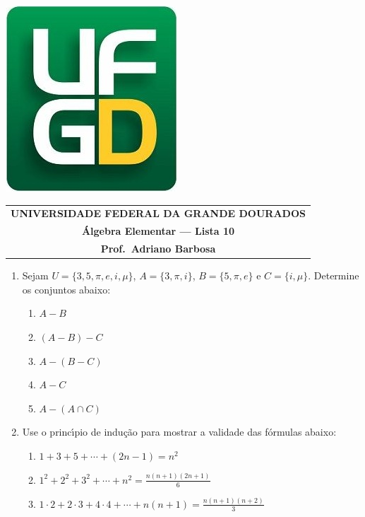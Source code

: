 \documentclass[a4paper,5pt]{amsbook}
\begin{document}
\thispagestyle{empty}
\pagestyle{empty}
\begin{minipage}[h]{0.14\textwidth}
	\includegraphics[scale=0.24]{../ufgd.png}
\end{minipage}
\begin{minipage}[h]{\textwidth}
\begin{tabular}{c}
{{\bf UNIVERSIDADE FEDERAL DA GRANDE DOURADOS}}\\
{{\bf \'Algebra Elementar --- Lista 10}}\\
{{\bf Prof.\ Adriano Barbosa}}\\
\end{tabular}
\vspace{-0.45cm}
%
\end{minipage}


\vspace{1cm}
\begin{enumerate}
    \vspace{0.5cm}
    \item Sejam $U=\{3,5,\pi,e,i,\mu\}$, $A=\{3,\pi,i\}$, $B=\{5,\pi,e\}$ e
    $C=\{i,\mu\}$. Determine os conjuntos abaixo:
        \begin{enumerate}
            \item $A-B$
            \item $(A-B)-C$
            \item $A-(B-C)$
            \item $A-C$
            \item $A-(A\cap C)$
        \end{enumerate}

    \vspace{0.5cm}
    \item Use o princ\'{\i}pio de indu\c{c}\~ao para mostrar a validade das f\'ormulas abaixo:
        \begin{enumerate}
            \item $1+3+5+\cdots+(2n-1) = n^2$
            \item $1^2+2^2+3^2+\cdots+n^2 = \displaystyle\frac{n(n+1)(2n+1)}{6}$
            \item $1\cdot2+2\cdot3+4\cdot4+\cdots+n(n+1) = \displaystyle\frac{n(n+1)(n+2)}{3}$
        \end{enumerate}
\end{enumerate}
\end{document}
